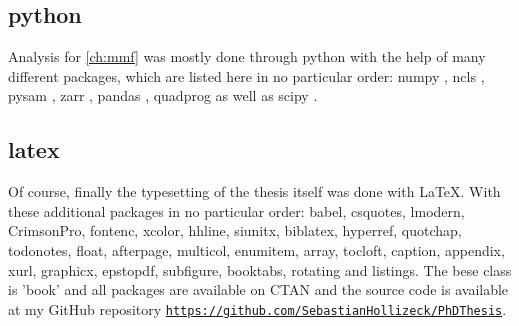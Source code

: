 {

\subsection*{python}
Analysis for \autoref{ch:mmf} was mostly done through python \cite{VanRossum2010} with the help of many different packages, which are listed here in no particular order: numpy \cite{Harris2020}, ncls \cite{Stovner2019}, pysam \cite{Heger2021,Bonfield2021,Danecek2021}, zarr \cite{Miles2021}, pandas \cite{McKinney2010,Reback2021}, quadprog \cite{McGibbon2021} as well as scipy \cite{Virtanen2020}.

\subsection*{latex}
Of course, finally the typesetting of the thesis itself was done with \LaTeX. With these additional packages in no particular order: babel, csquotes, lmodern, CrimsonPro, fontenc, xcolor, hhline, siunitx, biblatex, hyperref, quotchap, todonotes, float, afterpage, multicol, enumitem, array, tocloft, caption, appendix, xurl, graphicx, epstopdf, subfigure, booktabs, rotating and listings. 
The bese class is 'book' and all packages are available on CTAN and the source code is available at my GitHub repository \href{https://github.com/SebastianHollizeck/PhDThesis}{\nolinkurl{https://github.com/SebastianHollizeck/PhDThesis}}.

}

